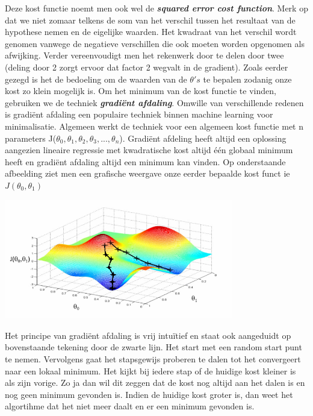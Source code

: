 Deze kost functie noemt men ook wel de \textbf{\textit{squared error cost function}}. Merk op dat we niet zomaar telkens de som van het verschil tussen het resultaat van de hypothese nemen en de eigelijke waarden. Het kwadraat van het verschil wordt genomen vanwege de negatieve verschillen die ook moeten worden opgenomen als afwijking. Verder vereenvoudigt men het rekenwerk door te delen door twee (deling door 2 zorgt ervoor dat factor 2 wegvalt in de gradient). 
\newline
Zoals eerder gezegd is het de bedoeling om de waarden van de $\theta's$ te bepalen zodanig onze kost zo klein mogelijk is. Om het minimum van de kost functie te vinden, gebruiken we de techniek \textbf{\textit{gradi\"ent afdaling}}. Omwille van verschillende redenen is gradi\"ent afdaling een populaire techniek binnen machine learning voor minimalisatie. Algemeen werkt de techniek voor een algemeen kost functie met n parameters J($\theta_{0},\theta_{1},\theta_{2},\theta_{3}, ... ,\theta_{n}$). Gradi\"ent afdeling heeft altijd een oplossing aangezien lineaire regressie met kwadratische kost altijd \'e\'en globaal minimum heeft en gradi\"ent afdaling altijd een minimum kan vinden.
Op onderstaande afbeelding ziet men een grafische weergave onze eerder bepaalde kost funct ie $J(\theta_{0},\theta_{1})$
\newline
\begin{center}
  \includegraphics[width=10cm]{3d_plot}
\end{center}
%
 Het principe van gradi\"ent afdaling is vrij intu\"itief en staat ook aangeduidt op bovenstaande tekening door de zwarte lijn. Het start met een random start punt te nemen. Vervolgens gaat het stapsgewijs proberen te dalen tot het convergeert naar een lokaal minimum. Het kijkt bij iedere stap of de huidige kost kleiner is als zijn vorige. Zo ja dan wil dit zeggen dat de kost nog altijd aan het dalen is en nog geen minimum gevonden is. Indien de huidige kost groter is, dan weet het algortihme dat het niet meer daalt en er een minimum gevonden is. 
